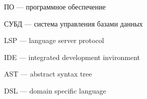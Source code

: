 
\hypertarget{ПО}{ПО --- программное обеспечение}

\hypertarget{СУБД}{СУБД --- система управления базами данных}

\hypertarget{LSP}{LSP --- language server protocol}

\hypertarget{IDE}{IDE --- integrated development invironment}

\hypertarget{AST}{AST --- abstract syntax tree}

\hypertarget{DSL}{DSL --- domain specific language}

\clearpage